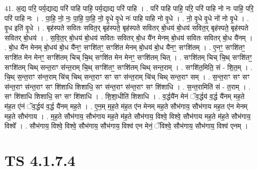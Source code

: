 \documentclass[17pt]{extarticle}
\begin{document}
41. अ॒द्य परि॒ पर्य॒द्याद्य परि॑ पाहि पाहि॒ पर्य॒द्याद्य परि॑ पाहि । . परि॑ पाहि पाहि॒ परि॒ परि॑ पाहि नो नः पाहि॒ परि॒ परि॑ पाहि नः । . पा॒हि॒ नो॒ नः॒ पा॒हि॒ पा॒हि॒ नो॒ वृ॒धे वृ॒धे नः॑ पाहि पाहि नो वृ॒धे । . नो॒ वृ॒धे वृ॒धे नो॑ नो वृ॒धे । . वृ॒ध इति॑ वृ॒धे । . बृह॑स्पते सवितः सवित॒र् बृह॑स्पते॒ बृह॑स्पते सवितर् बो॒धय॑ बो॒धय॑ सवित॒र् बृह॑स्पते॒ बृह॑स्पते सवितर् बो॒धय॑ । . स॒वि॒त॒र् बो॒धय॑ बो॒धय॑ सवितः सवितर् बो॒ध यै॑न मेनम् बो॒धय॑ सवितः सवितर् बो॒ध यै॑नम् । . बो॒ध यै॑न मेनम् बो॒धय॑ बो॒ध यै॑नꣳ॒॒ सꣳशि॑तꣳ॒॒ सꣳशि॑त मेनम् बो॒धय॑ बो॒ध यै॑नꣳ॒॒ सꣳशि॑तम् । . ए॒नꣳ॒॒ सꣳशि॑तꣳ॒॒ सꣳशि॑त मेन मेनꣳ॒॒ सꣳशि॑तम् चिच् चि॒थ् सꣳशि॑त मेन मेनꣳ॒॒ सꣳशि॑तम् चित् । . सꣳशि॑तम् चिच् चि॒थ् सꣳशि॑तꣳ॒॒ सꣳशि॑तम् चिथ् सन्त॒राꣳ स॑न्त॒राम् चि॒थ् सꣳशि॑तꣳ॒॒ सꣳशि॑तम् चिथ् सन्त॒राम् । . सꣳशि॑त॒मिति॒ सं - शि॒त॒म् । . चि॒थ् स॒न्त॒राꣳ स॑न्त॒राम् चि॑च् चिथ् सन्त॒राꣳ सꣳ सꣳ स॑न्त॒राम् चि॑च् चिथ् सन्त॒राꣳ सम् । . स॒न्त॒राꣳ सꣳ सꣳ स॑न्त॒राꣳ स॑न्त॒राꣳ सꣳ शि॑शाधि शिशाधि॒ सꣳ स॑न्त॒राꣳ स॑न्त॒राꣳ सꣳ शि॑शाधि । . स॒न्त॒रामिति॑ सं - त॒राम् । . सꣳ शि॑शाधि शिशाधि॒ सꣳ सꣳ शि॑शाधि । . शि॒शा॒धीति॑ शिशाधि । . व॒र्द्धयै॑न मेनं ॅव॒र्द्धय॑ व॒र्द्ध यै॑नम् मह॒ते म॑ह॒त ए॑नं ॅव॒र्द्धय॑ व॒र्द्ध यै॑नम् मह॒ते । . ए॒न॒म् म॒ह॒ते म॑ह॒त ए॑न मेनम् मह॒ते सौभ॑गाय॒ सौभ॑गाय मह॒त ए॑न मेनम् मह॒ते सौभ॑गाय । . म॒ह॒ते सौभ॑गाय॒ सौभ॑गाय मह॒ते म॑ह॒ते सौभ॑गाय॒ विश्वे॒ विश्वे॒ सौभ॑गाय मह॒ते म॑ह॒ते सौभ॑गाय॒ विश्वे᳚ । . सौभ॑गाय॒ विश्वे॒ विश्वे॒ सौभ॑गाय॒ सौभ॑गाय॒ विश्व॑ एन मेनं॒ ॅविश्वे॒ सौभ॑गाय॒ सौभ॑गाय॒ विश्व॑ एनम् । \newline
\pagebreak
{}

\section{ TS 4.1.7.4 }
\end{document}
